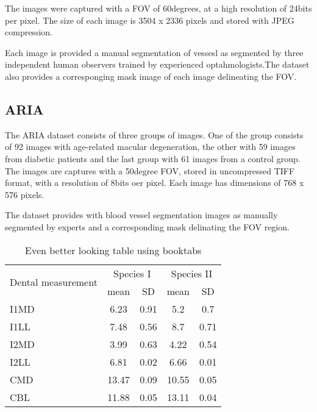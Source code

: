 The images were captured with a FOV of 60degrees, at a high resolution of 24bits per pixel. The size of each image is 3504 x 2336 pixels and stored with JPEG compression. 

Each image is provided a manual segmentation of vessesl as segmented by three independent human observers trained by experienced optahmologists.The dataset also provides a corresponging mask image of each image delineating the FOV.

\subsection{ARIA}
The ARIA dataset consists of three groups of images. One of the group consists of 92 images with age-related macular degeneration, the other with 59 images from diabetic patients and the last group with 61 images from a control group.
The images are captures with a 50degree FOV, stored in uncompressed TIFF format, with a resolution of 8bits oer pixel. Each image has dimensions of 768 x 576 pixels.

The dataset provides with blood vessel segmentation images as manually segmented by experts and a corresponding mask delinating the FOV region.



\begin{table}
\caption{Even better looking table using booktabs}
\centering
\label{table:good_table}
\begin{tabular}{l c c c c}
\toprule
\multirow{2}{*}{Dental measurement} & \multicolumn{2}{c}{Species I} & \multicolumn{2}{c}{Species II} \\ 
\cmidrule{2-5}
  & mean & SD  & mean & SD  \\ 
\midrule
I1MD & 6.23 & 0.91 & 5.2  & 0.7  \\

I1LL & 7.48 & 0.56 & 8.7  & 0.71 \\

I2MD & 3.99 & 0.63 & 4.22 & 0.54 \\

I2LL & 6.81 & 0.02 & 6.66 & 0.01 \\

CMD & 13.47 & 0.09 & 10.55 & 0.05 \\

CBL & 11.88 & 0.05 & 13.11 & 0.04\\ 
\bottomrule
\end{tabular}
\end{table}
